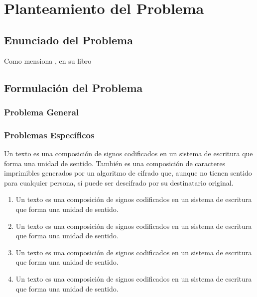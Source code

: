 	\chapter{Planteamiento del Problema}\label{Cap: Planteamiento del Problema}
		\lipsum \lipsum[3]
			\section{Enunciado del Problema}\label{Sec: Enunciado del Problema}
				\lipsum[4]
				Como mensiona \cite{Koop-2003}, en su libro
				\lipsum[5]		
			\section{Formulación del Problema}\label{Sec: Formulación del Problema}
				\lipsum[5]
					\subsection{Problema General}\label{Subsec: Problema General}	
						\lipsum[6]
					\subsection{Problemas Específicos}\label{Subsec: Problemas Específicos}
						\lipsum[1]
						Un texto es una composición de signos codificados en un sistema
						de escritura que forma una unidad de sentido. También es una composición
						de caracteres imprimibles generados por un algoritmo de cifrado que, aunque no
						tienen sentido para cualquier persona, sí puede ser descifrado por su destinatario original.
						\begin{enumerate}
							\item Un texto es una composición de signos codificados en un sistema
							de escritura que forma una unidad de sentido.
							\item Un texto es una composición de signos codificados en un sistema
							de escritura que forma una unidad de sentido.
							\item Un texto es una composición de signos codificados en un sistema
							de escritura que forma una unidad de sentido.
							\item Un texto es una composición de signos codificados en un sistema
							de escritura que forma una unidad de sentido.
						\end{enumerate}
		